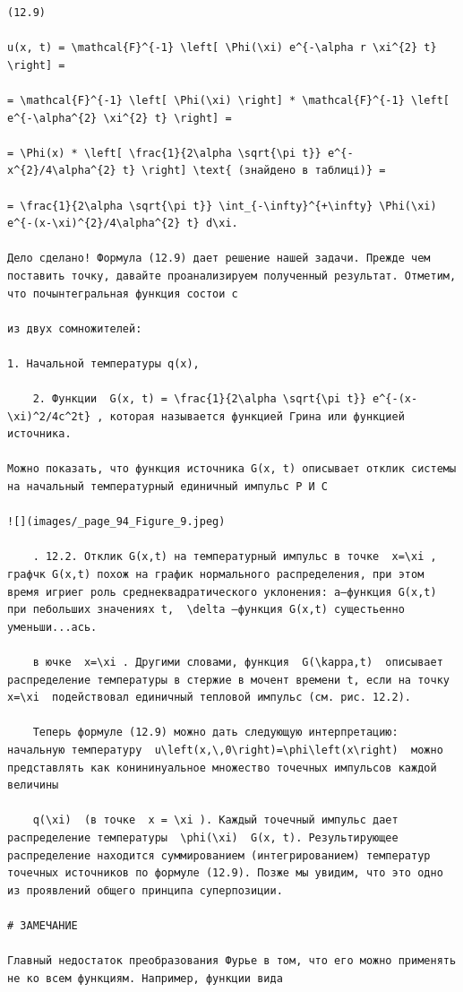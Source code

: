 \documentclass[
  ukrainian,
]{article}
\begin{document}
\begin{verbatim}
(12.9)

u(x, t) = \mathcal{F}^{-1} \left[ \Phi(\xi) e^{-\alpha r \xi^{2} t} \right] =

= \mathcal{F}^{-1} \left[ \Phi(\xi) \right] * \mathcal{F}^{-1} \left[ e^{-\alpha^{2} \xi^{2} t} \right] =

= \Phi(x) * \left[ \frac{1}{2\alpha \sqrt{\pi t}} e^{-x^{2}/4\alpha^{2} t} \right] \text{ (знайдено в таблиці)} =

= \frac{1}{2\alpha \sqrt{\pi t}} \int_{-\infty}^{+\infty} \Phi(\xi) e^{-(x-\xi)^{2}/4\alpha^{2} t} d\xi.

Дело сделано! Формула (12.9) дает решение нашей задачи. Прежде чем поставить точку, давайте проанализируем полученный результат. Отметим, что почынтегральная функция состои с

из двух сомножителей:

1. Начальной температуры q(x),

    2. Функции  G(x, t) = \frac{1}{2\alpha \sqrt{\pi t}} e^{-(x-\xi)^2/4c^2t} , которая называется функцией Грина или функцией источника.

Можно показать, что функция источника G(x, t) описывает отклик системы на начальный температурный единичный импульс Р И С

![](images/_page_94_Figure_9.jpeg)

    . 12.2. Отклик G(x,t) на температурный импульс в точке  x=\xi , графчк G(x,t) похож на график нормального распределения, при этом время игриег роль среднеквадратического уклонения: a—функция G(x,t) при пебольших значениях t,  \delta —функция G(x,t) сущестьенно уменьши...ась.

    в ючке  x=\xi . Другими словами, функция  G(\kappa,t)  описывает распределение температуры в стержие в мочент времени t, если на точку  x=\xi  подействовал единичный тепловой импульс (см. рис. 12.2).

    Теперь формуле (12.9) можно дать следующую интерпретацию: начальную температуру  u\left(x,\,0\right)=\phi\left(x\right)  можно представлять как конининуальное множество точечных импульсов каждой величины

    q(\xi)  (в точке  x = \xi ). Каждый точечный импульс дает распределение температуры  \phi(\xi)  G(x, t). Результирующее распределение находится суммированием (интегрированием) температур точечных источников по формуле (12.9). Позже мы увидим, что это одно из проявлений общего принципа суперпозиции.

# ЗАМЕЧАНИЕ

Главный недостаток преобразования Фурье в том, что его можно применять не ко всем функциям. Например, функции вида


\end{verbatim}
\end{document}
